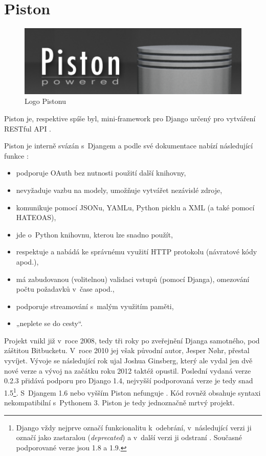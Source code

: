 \section{Piston}\label{piston}

\begin{figure}
\centering
\includegraphics{images/piston}
\caption{Logo Pistonu \autocite{pistonpic}\label{pic:piston}}
\end{figure}

Piston je, respektive spíše byl, mini-framework pro Django určený pro vytváření RESTful API \autocite{piston}.

Piston je interně svázán s~Djangem a podle své dokumentace nabízí následující funkce \autocite{piston}:

\begin{itemize}
\tightlist
\item
  podporuje OAuth bez nutnosti použití další knihovny,
\item
  nevyžaduje vazbu na modely, umožňuje vytvářet nezávislé zdroje,
\item
  komunikuje pomocí JSONu, YAMLu, Python picklu a XML (a také pomocí HATEOAS),
\item
  jde o~Python knihovnu, kterou lze snadno použít,
\item
  respektuje a nabádá ke správnému využití HTTP protokolu (návratové kódy apod.),
\item
  má zabudovanou (volitelnou) validaci vstupů (pomocí Djanga), omezování počtu požadavků v~čase apod.,
\item
  podporuje streamování s~malým využitím paměti,
\item
  „neplete se do cesty“.
\end{itemize}

Projekt vnikl již v~roce 2008, tedy tři roky po zveřejnění Djanga samotného, pod záštitou Bitbucketu. V~roce 2010 jej však původní autor, Jesper Nøhr, přestal vyvíjet. Vývoje se následující rok ujal Joshua Ginsberg, který ale vydal jen dvě nové verze a vývoj na začátku roku 2012 taktéž opustil. Poslední vydaná verze 0.2.3 přidává podporu pro Django 1.4, nejvyšší podporovaná verze je tedy snad 1.5\footnote{Django vždy nejprve označí funkcionalitu k~odebrání, v~následující verzi ji označí jako zastaralou (\emph{deprecated}) a v~další verzi ji odstraní \autocite{djangorelease}. Současné podporované verze jsou 1.8 a 1.9.}. S~Djangem 1.6 nebo vyšším Piston nefunguje \autocite{piston16}. Kód rovněž obsahuje syntaxi nekompatibilní s~Pythonem 3. Piston je tedy jednoznačně mrtvý projekt.

